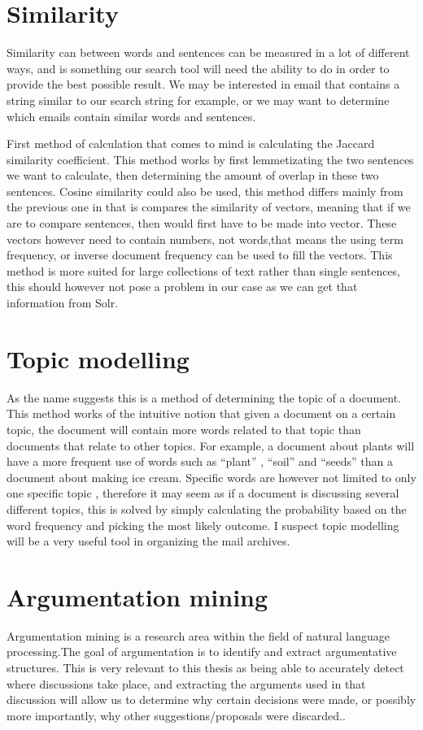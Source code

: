 \documentclass{report}
\begin{document}
\section{Similarity}
Similarity  can between words and sentences can be measured in a lot of different ways, and is something our search tool will need the ability to do in order to provide the best possible result. We may be interested in email that contains a string similar to our search string for example, or we may want to determine which emails contain similar words and sentences.

First method of calculation that comes to mind is calculating the Jaccard similarity coefficient.
This method works by first lemmetizating the two sentences we want to calculate, then determining the amount of overlap in these two sentences. 
Cosine similarity could also be used, this method differs mainly from the previous one in that is compares the similarity of vectors, meaning that if we are to compare sentences, then would first have to be made into vector. These vectors however need to contain numbers, not words,that means the using term frequency, or inverse document frequency can be used to fill the vectors. This method is more suited for large collections of text rather than single sentences, this should however not pose a problem in our case as we can get that information from Solr.

\section{Topic modelling}
As the name suggests this is a method of determining the topic of a document. This method works of the intuitive notion that given a document on a certain topic, the document will contain more words related to that topic than documents that relate to other topics. For example, a document about plants will have a more frequent use of words such as “plant” , “soil” and “seeds” than a document about making ice cream. Specific words are however not limited to only one specific topic , therefore it may seem as if a document is discussing several different topics, this is solved by simply calculating the probability based on the word frequency and picking the most likely outcome. I suspect topic modelling will be a very useful tool in organizing the mail archives.

\section{Argumentation mining}
Argumentation mining is a research area within the field of natural language processing.The goal of argumentation is to identify and extract argumentative structures. This is very relevant to this thesis as being able to accurately detect where discussions take place, and extracting the arguments used in that discussion will allow us to determine why certain decisions were made, or possibly more importantly, why other suggestions/proposals were discarded..  
\end{document}
